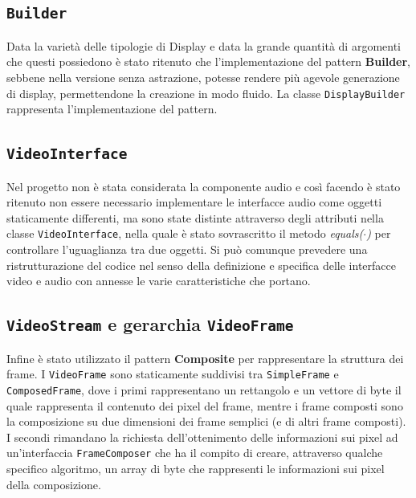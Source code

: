 \documentclass[a4paper,11pt]{article}
\begin{document}
	\subsection{\texttt{Builder}}
	Data la varietà delle tipologie di Display e data la grande quantità di argomenti che questi possiedono è stato ritenuto che l'implementazione del pattern \textbf{Builder}, sebbene nella versione senza astrazione, potesse rendere più agevole generazione di display, permettendone la creazione in modo fluido. La classe \texttt{DisplayBuilder} rappresenta l'implementazione del pattern.\\
	
	\subsection{\texttt{VideoInterface}}
	Nel progetto non è stata considerata la componente audio e così facendo è stato ritenuto non essere necessario implementare le interfacce audio come oggetti staticamente differenti, ma sono state distinte attraverso degli attributi nella classe \texttt{VideoInterface}, nella quale è stato sovrascritto il metodo \textit{equals($\cdot$)} per controllare l'uguaglianza tra due oggetti. Si può comunque prevedere una ristrutturazione del codice nel senso della definizione e specifica delle interfacce video e audio con annesse le varie caratteristiche che portano.\\
	
	\subsection{\texttt{VideoStream} e gerarchia \texttt{VideoFrame}}
	Infine è stato utilizzato il pattern \textbf{Composite} per rappresentare la struttura dei frame. I \texttt{VideoFrame} sono staticamente suddivisi tra \texttt{SimpleFrame} e \texttt{ComposedFrame}, dove i primi rappresentano un rettangolo e un vettore di byte il quale rappresenta il contenuto dei pixel del frame, mentre i frame composti sono la composizione su due dimensioni dei frame semplici (e di altri frame composti). I secondi rimandano la richiesta dell'ottenimento delle informazioni sui pixel ad un'interfaccia \texttt{FrameComposer} che ha il compito di creare, attraverso qualche specifico algoritmo, un array di byte che rappresenti le informazioni sui pixel della composizione.
	
\end{document}
